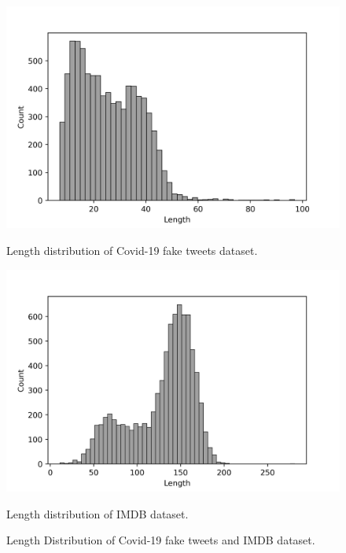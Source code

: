 \documentclass[%
	BCOR=8mm, %
	DIV=12,
	toc=bibliography, %
	toc=listof, %
	oneside, %
	egregdoesnotlikesansseriftitles, %
	]{scrbook}
\begin{document}
\begin{figure}[ht]
     \hspace*{3.0em}
    \begin{minipage}[b]{0.4\linewidth}
        \centering
        \includegraphics[width=\textwidth]{img/fakenewsLengthdist.png}
        \caption{Length distribution of Covid-19 fake tweets dataset.}
        \label{fig:fklendist}
    \end{minipage}
    \hspace{0.1cm}
    \begin{minipage}[b]{0.4\linewidth}
        \centering
        \includegraphics[width=\textwidth]{img/ImdbLengthdist.png}
        \caption{Length distribution of IMDB dataset.}{}
        \label{fig:imdblendist}
    \end{minipage}
    \caption[Length distribution of Covid-19 fake tweets and IMDB dataset]{\small Length Distribution of Covid-19 fake tweets and IMDB dataset.}
    \label{fig:lendist}
\end{figure}
\end{document}
